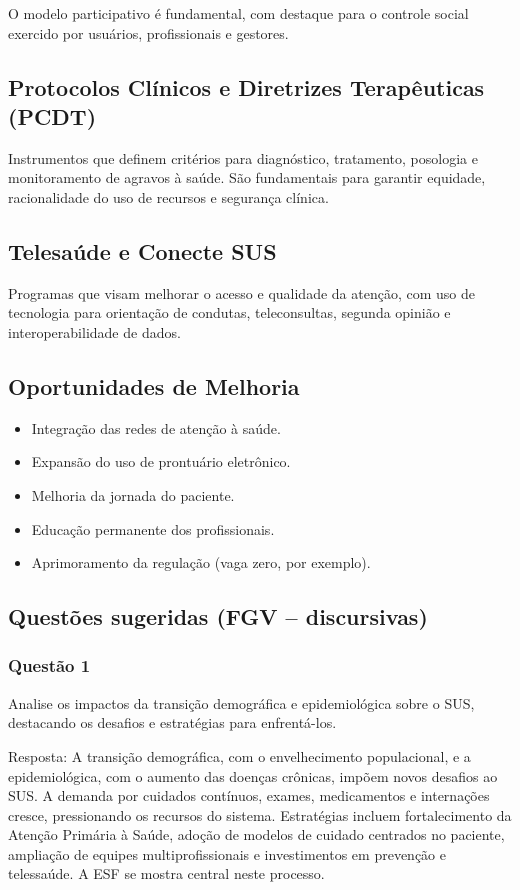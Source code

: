 \documentclass[a4paper,12pt]{article}
\begin{document}
O modelo participativo é fundamental, com destaque para o controle social exercido por usuários, profissionais e gestores.
\subsection{Protocolos Clínicos e Diretrizes Terapêuticas (PCDT)}
\label{sec:orgd33a306}
Instrumentos que definem critérios para diagnóstico, tratamento, posologia e monitoramento de agravos à saúde. São fundamentais para garantir equidade, racionalidade do uso de recursos e segurança clínica.
\subsection{Telesaúde e Conecte SUS}
\label{sec:org801e7f6}
Programas que visam melhorar o acesso e qualidade da atenção, com uso de tecnologia para orientação de condutas, teleconsultas, segunda opinião e interoperabilidade de dados.
\subsection{Oportunidades de Melhoria}
\label{sec:orgd57e19e}
\begin{itemize}
\item Integração das redes de atenção à saúde.
\item Expansão do uso de prontuário eletrônico.
\item Melhoria da jornada do paciente.
\item Educação permanente dos profissionais.
\item Aprimoramento da regulação (vaga zero, por exemplo).
\end{itemize}
\subsection{Questões sugeridas (FGV – discursivas)}
\label{sec:orgf30286a}

\subsubsection{Questão 1}
\label{sec:org7a5533c}
Analise os impactos da transição demográfica e epidemiológica sobre o SUS, destacando os desafios e estratégias para enfrentá-los.

Resposta:
A transição demográfica, com o envelhecimento populacional, e a epidemiológica, com o aumento das doenças crônicas, impõem novos desafios ao SUS. A demanda por cuidados contínuos, exames, medicamentos e internações cresce, pressionando os recursos do sistema. Estratégias incluem fortalecimento da Atenção Primária à Saúde, adoção de modelos de cuidado centrados no paciente, ampliação de equipes multiprofissionais e investimentos em prevenção e telessaúde. A ESF se mostra central neste processo.
\end{document}
